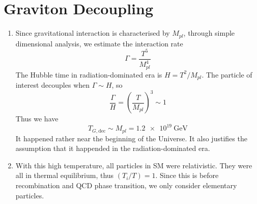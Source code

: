 \section{Graviton Decoupling}
\begin{enumerate}[label=\alph*)]
   \item Since gravitational interaction is characterised by $M_{pl}$, through simple dimensional analysis, we estimate the interaction rate
      \begin{equation}
         \Gamma = \frac{T^5}{M_{pl}^4}
      \end{equation}
      The Hubble time in radiation-dominated era is $H = T^{2}/M_{pl}$. The particle of interest decouples when $\Gamma \sim H$, so
      \begin{equation*}
         \frac{\Gamma}{H} = \left( \frac{T}{M_{pl}} \right)^3 \sim 1 
      \end{equation*}
      Thus we have
      \begin{equation}
         T_{G,\text{dec}} \sim M_{pl} = \SI{1.2e19}{\giga\eV}
      \end{equation}
      It happened rather near the beginning of the Universe. It also justifies the assumption that it happended in the radiation-dominated era.

   \item With this high temperature, all particles in SM were relativistic. They were all in thermal equilibrium, thus $(T_i/T) = 1$. Since this is before recombination and QCD phase transition, we only consider elementary particles. 


\end{enumerate}
